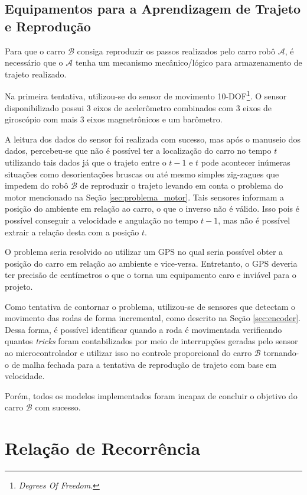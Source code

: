 	\subsection{Equipamentos para a Aprendizagem de Trajeto e Reprodução}

		Para que o carro $ \mathcal{B} $ consiga reproduzir os passos realizados pelo carro robô $ \mathcal{A} $, é necessário que o $ \mathcal{A} $ tenha um mecanismo mecânico/lógico para armazenamento de trajeto realizado.

		Na primeira tentativa, utilizou-se do sensor de movimento 10-DOF\footnote{\textit{Degrees Of Freedom}.}. O sensor disponibilizado possui 3 eixos de acelerômetro combinados com 3 eixos de giroscópio com mais 3 eixos magnetrônicos e um barômetro.

		A leitura dos dados do sensor foi realizada com sucesso, mas após o manuseio dos dados, percebeu-se que não é possível ter a localização do carro no tempo $t$ utilizando tais dados já que o trajeto entre o $t-1$ e $t$ pode acontecer inúmeras situações como desorientações bruscas ou até mesmo simples zig-zagues que impedem do robô $ \mathcal{B} $ de reproduzir o trajeto levando em conta o problema do motor mencionado na Seção \ref{sec:problema_motor}. Tais sensores informam a posição do ambiente em relação ao carro, o que o inverso não é válido. Isso pois é possível conseguir a velocidade e angulação no tempo $t-1$, mas não é possível extrair a relação desta com a posição $t$.

		O problema seria resolvido ao utilizar um GPS no qual seria possível obter a posição do carro em relação ao ambiente e vice-versa. Entretanto, o GPS deveria ter precisão de centímetros o que o torna um equipamento caro e inviável para o projeto.

		Como tentativa de contornar o problema, utilizou-se de sensores que detectam o movimento das rodas de forma incremental, como descrito na Seção \ref{sec:encoder}. Dessa forma, é possível identificar quando a roda é movimentada verificando quantos \textit{tricks} foram contabilizados por meio de interrupções geradas pelo sensor ao microcontrolador e utilizar isso no controle proporcional do carro $ \mathcal{B} $ tornando-o de malha fechada para a tentativa de reprodução de trajeto com base em velocidade.

		Porém, todos os modelos implementados foram incapaz de concluir o objetivo do carro $ \mathcal{B} $ com sucesso.



\section{Relação de Recorrência} \label{sec:recorrencia}

